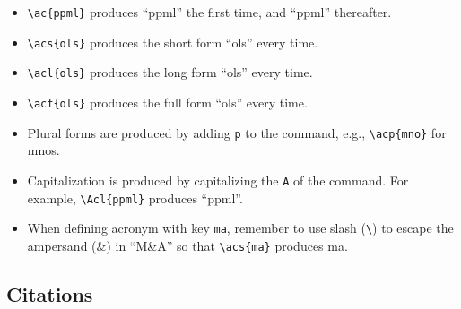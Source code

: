 \documentclass[
12pt,
a4paper,
twoside,
]{article}
\providecommand{\tightlist}{\setlength{\itemsep}{0pt}\setlength{\parskip}{0pt}}
\begin{document}
\begin{itemize}
\tightlist
\item
  \texttt{\textbackslash{}ac\{ppml\}} produces ``\ac{ppml}'' the first
  time, and ``\ac{ppml}'' thereafter.
\item
  \texttt{\textbackslash{}acs\{ols\}} produces the short form
  ``\acs{ols}'' every time.
\item
  \texttt{\textbackslash{}acl\{ols\}} produces the long form
  ``\acl{ols}'' every time.
\item
  \texttt{\textbackslash{}acf\{ols\}} produces the full form
  ``\acf{ols}'' every time.
\item
  Plural forms are produced by adding \texttt{p} to the command, e.g.,
  \texttt{\textbackslash{}acp\{mno\}} for \acp{mno}.
\item
  Capitalization is produced by capitalizing the \texttt{A} of the
  command. For example, \texttt{\textbackslash{}Acl\{ppml\}} produces
  ``\Acl{ppml}''.
\item
  When defining acronym with key \texttt{ma}, remember to use slash
  (\texttt{\textbackslash{}}) to escape the ampersand (\&) in ``M\&A''
  so that \texttt{\textbackslash{}acs\{ma\}} produces \ac{ma}.
\end{itemize}

\subsection{Citations}\label{citations}
\end{document}
